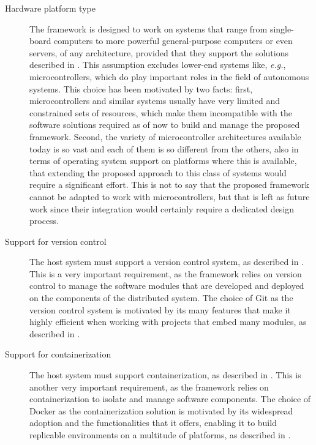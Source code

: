 \begin{description}
  \item[Hardware platform type] The framework is designed to work on systems that range from single-board computers to more powerful general-purpose computers or even servers, of any architecture, provided that they support the solutions described in . This assumption excludes lower-end systems like, \emph{e.g.}, microcontrollers, which do play important roles in the field of autonomous systems. This choice has been motivated by two facts: first, microcontrollers and similar systems usually have very limited and constrained sets of resources, which make them incompatible with the software solutions required as of now to build and manage the proposed framework. Second, the variety of microcontroller architectures available today is so vast and each of them is so different from the others, also in terms of operating system support on platforms where this is available, that extending the proposed approach to this class of systems would require a significant effort. This is not to say that the proposed framework cannot be adapted to work with microcontrollers, but that is left as future work since their integration would certainly require a dedicated design process.
  \item[Support for version control] The host system must support a version control system, as described in . This is a very important requirement, as the framework relies on version control to manage the software modules that are developed and deployed on the components of the distributed system. The choice of Git as the version control system is motivated by its many features that make it highly efficient when working with projects that embed many modules, as described in .
  \item[Support for containerization] The host system must support containerization, as described in . This is another very important requirement, as the framework relies on containerization to isolate and manage software components. The choice of Docker as the containerization solution is motivated by its widespread adoption and the functionalities that it offers, enabling it to build replicable environments on a multitude of platforms, as described in .

\end{description}
